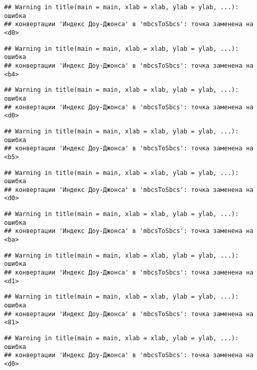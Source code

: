 \documentclass[
]{article}
\begin{document}
\begin{verbatim}
## Warning in title(main = main, xlab = xlab, ylab = ylab, ...): ошибка
## конвертации 'Индекс Доу-Джонса' в 'mbcsToSbcs': точка заменена на <d0>
\end{verbatim}

\begin{verbatim}
## Warning in title(main = main, xlab = xlab, ylab = ylab, ...): ошибка
## конвертации 'Индекс Доу-Джонса' в 'mbcsToSbcs': точка заменена на <b4>
\end{verbatim}

\begin{verbatim}
## Warning in title(main = main, xlab = xlab, ylab = ylab, ...): ошибка
## конвертации 'Индекс Доу-Джонса' в 'mbcsToSbcs': точка заменена на <d0>
\end{verbatim}

\begin{verbatim}
## Warning in title(main = main, xlab = xlab, ylab = ylab, ...): ошибка
## конвертации 'Индекс Доу-Джонса' в 'mbcsToSbcs': точка заменена на <b5>
\end{verbatim}

\begin{verbatim}
## Warning in title(main = main, xlab = xlab, ylab = ylab, ...): ошибка
## конвертации 'Индекс Доу-Джонса' в 'mbcsToSbcs': точка заменена на <d0>
\end{verbatim}

\begin{verbatim}
## Warning in title(main = main, xlab = xlab, ylab = ylab, ...): ошибка
## конвертации 'Индекс Доу-Джонса' в 'mbcsToSbcs': точка заменена на <ba>
\end{verbatim}

\begin{verbatim}
## Warning in title(main = main, xlab = xlab, ylab = ylab, ...): ошибка
## конвертации 'Индекс Доу-Джонса' в 'mbcsToSbcs': точка заменена на <d1>
\end{verbatim}

\begin{verbatim}
## Warning in title(main = main, xlab = xlab, ylab = ylab, ...): ошибка
## конвертации 'Индекс Доу-Джонса' в 'mbcsToSbcs': точка заменена на <81>
\end{verbatim}

\begin{verbatim}
## Warning in title(main = main, xlab = xlab, ylab = ylab, ...): ошибка
## конвертации 'Индекс Доу-Джонса' в 'mbcsToSbcs': точка заменена на <d0>
\end{verbatim}
\end{document}
